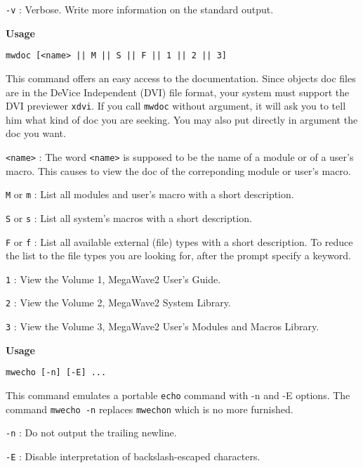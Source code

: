\verb+-v+ : Verbose. Write more information on the standard output.

\newpage

{\Large\bf Usage} \bigskip

\verb+mwdoc [<name> || M || S || F || 1 || 2 || 3]+

\Next

\Description
This command offers an easy access to the documentation. Since objects doc files are in the
DeVice Independent (DVI) file format, your system must support the DVI previewer \verb+xdvi+.
If you call \verb+mwdoc+ without argument, it will ask you to tell him what kind of doc you
are seeking. You may also put directly in argument the doc you want.

\Next
\Options
\verb+<name>+ : The word \verb+<name>+ is supposed to be the name of a module or of a user's macro.
This causes to view the doc of the correponding module or user's macro.               

\verb+M+ or \verb+m+ : List all modules and user's macro with a short description.

\verb+S+ or \verb+s+ : List all system's macros with a short description.

\verb+F+ or \verb+f+ : List all available external (file) types with a short description. To reduce the
list to the file types you are looking for, after the prompt specify a keyword.

\verb+1+ : View the Volume 1, MegaWave2 User's Guide.

\verb+2+ : View the Volume 2, MegaWave2 System Library.

\verb+3+ : View the Volume 3, MegaWave2 User's Modules and Macros Library.

\newpage

{\Large\bf Usage} \bigskip

\verb+mwecho [-n] [-E] ...+

\Next

\Description
This command emulates a portable \verb+echo+ command with -n and -E options.
The command \verb+mwecho -n+ replaces \verb+mwechon+ which is no more furnished.
\Next

\Options

\verb+-n+ : Do not output the trailing newline.

\verb+-E+ : Disable interpretation of backslash-escaped characters. 

